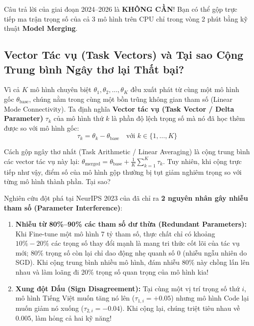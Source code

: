 Câu trả lời của giai đoạn 2024--2026 là \textbf{KHÔNG CẦN}! Bạn có thể gộp trực tiếp ma trận trọng số của cả 3 mô hình trên CPU chỉ trong vòng 2 phút bằng kỹ thuật \textbf{Model Merging}.

\subsection{Vector Tác vụ (Task Vectors) và Tại sao Cộng Trung bình Ngây thơ lại Thất bại?}

Vì cả $K$ mô hình chuyên biệt $\theta_1, \theta_2, \dots, \theta_K$ đều xuất phát từ cùng một mô hình gốc $\theta_{\text{base}}$, chúng nằm trong cùng một bồn trũng không gian tham số (Linear Mode Connectivity). Ta định nghĩa \textbf{Vector tác vụ (Task Vector / Delta Parameter)} $\tau_k$ của mô hình thứ $k$ là phần độ lệch trọng số mà nó đã học thêm được so với mô hình gốc:
\begin{equation}
  \tau_k = \theta_k - \theta_{\text{base}} \quad \text{với } k \in \{1, \dots, K\}
  \label{eq:task_vector}
\end{equation}

Cách gộp ngây thơ nhất (Task Arithmetic / Linear Averaging) là cộng trung bình các vector tác vụ này lại: $\theta_{\text{merged}} = \theta_{\text{base}} + \frac{1}{K}\sum_{k=1}^K \tau_k$. Tuy nhiên, khi cộng trực tiếp như vậy, điểm số của mô hình gộp thường bị tụt giảm nghiêm trọng so với từng mô hình thành phần. Tại sao?

Nghiên cứu đột phá tại NeurIPS 2023 của \citet{yadav2023ties} đã chỉ ra \textbf{2 nguyên nhân gây nhiễu tham số (Parameter Interference)}:
\begin{enumerate}
  \item \textbf{Nhiễu từ 80\%--90\% các tham số dư thừa (Redundant Parameters):} Khi Fine-tune một mô hình 7 tỷ tham số, thực chất chỉ có khoảng $10\% - 20\%$ các trọng số thay đổi mạnh là mang tri thức cốt lõi của tác vụ mới; $80\%$ trọng số còn lại chỉ dao động nhẹ quanh số $0$ (nhiễu ngẫu nhiên do SGD). Khi cộng trung bình nhiều mô hình, đám nhiễu 80\% này chồng lấn lên nhau và làm loãng đi 20\% trọng số quan trọng của mô hình kia!
  \item \textbf{Xung đột Dấu (Sign Disagreement):} Tại cùng một vị trí trọng số thứ $i$, mô hình Tiếng Việt muốn tăng nó lên ($\tau_{1,i} = +0.05$) nhưng mô hình Code lại muốn giảm nó xuống ($\tau_{2,i} = -0.04$). Khi cộng lại, chúng triệt tiêu nhau về $0.005$, làm hỏng cả hai kỹ năng!
\end{enumerate}

